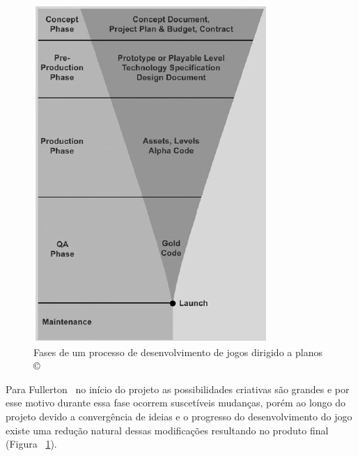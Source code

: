 \begin{figure}[!htbp]
 \centering
 \includegraphics[scale=0.5]{./img/stages-game-development.jpg}
\caption[Fases de um processo de desenvolvimento de jogos dirigido a planos \copyright]{Fases de um processo de desenvolvimento de jogos dirigido a planos \copyright ~\cite{fullerton2008game}}
 \label{fig:processoful}
\end{figure}

Para Fullerton~\cite{fullerton2008game} no início do projeto as possibilidades criativas são grandes e por esse motivo durante essa fase ocorrem suscetíveis mudanças, porém ao longo do projeto devido a convergência de ideias e o progresso do desenvolvimento do jogo existe uma redução natural dessas modificações resultando no produto final~\cite{fullerton2008game} (Figura ~\ref{fig:processoful}).

